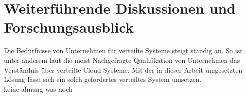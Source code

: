 \section{Weiterführende Diskussionen und Forschungsausblick}
Die Bedürfnisse von Unternehmen für verteilte Systeme steigt ständig an. So ist unter anderem laut \cite{theSkillsCompaniesNeedMost} die meist Nachgefragte Qualifikation von Unternehmen das Verständnis über verteilte Cloud-Systeme. Mit der in dieser Arbeit umgesetzten Lösung lässt sich ein solch gefordertes verteiltes System umsetzen. \\
keine ahnung was noch
% 
% 
